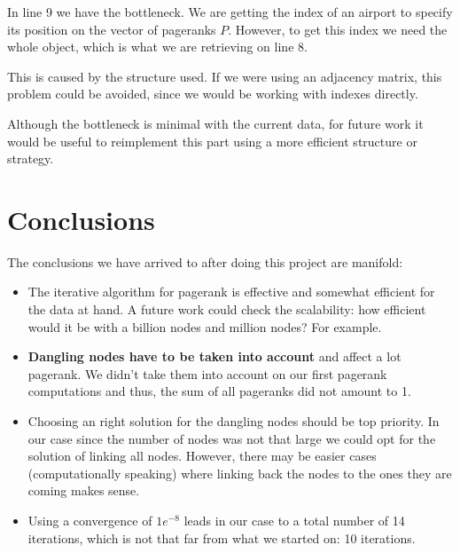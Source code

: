 \documentclass[10pt, a4paper]{article}
\begin{document}
In line 9 we have the bottleneck. We are getting the index of an airport to specify its position on the vector of pageranks $P$. However, to get this index we need the whole object, which is what we are retrieving on line 8.

This is caused by the structure used. If we were using an adjacency matrix, this problem could be avoided, since we would be working with indexes directly.

Although the bottleneck is minimal with the current data, for future work it would be useful to reimplement this part using a more efficient structure or strategy.

\section{Conclusions}
The conclusions we have arrived to after doing this project are manifold:
\begin{itemize}
    \item The iterative algorithm for pagerank is effective and somewhat efficient for the data at hand. A future work could check the scalability: how efficient would it be with a billion nodes and million nodes? For example.
    \item \textbf{Dangling nodes have to be taken into account} and affect a lot pagerank. We didn't take them into account on our first pagerank computations and thus, the sum of all pageranks did not amount to 1. 
    \item Choosing an right solution for the dangling nodes should be top priority. In our case since the number of nodes was not that large we could opt for the solution of linking all nodes. However, there may be easier cases (computationally speaking) where linking back the nodes to the ones they are coming makes sense.
    \item Using a convergence of $1e^{-8}$ leads in our case to a total number of 14 iterations, which is not that far from what we started on: 10 iterations.
\end{itemize}

\nocite{*}


\end{document}

